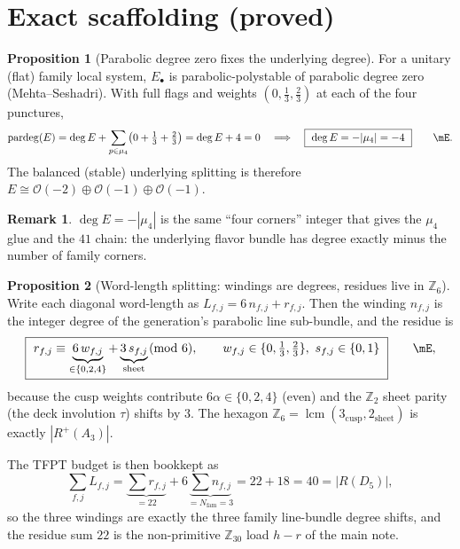 \documentclass[11pt,a4paper]{article}
\newcommand{\Nfam}{N_{\mathrm{fam}}}
\newcommand{\pardeg}{\operatorname{pardeg}}
\theoremstyle{definition}
\newtheorem{proposition}{Proposition}
\newtheorem*{remark}{Remark}
\begin{document}
\section{Exact scaffolding (proved)}
\begin{proposition}[Parabolic degree zero fixes the underlying degree]
For a unitary (flat) family local system, $E_\bullet$ is parabolic-polystable of parabolic degree zero
(Mehta--Seshadri). With full flags and weights $(0,\tfrac13,\tfrac23)$ at each of the four punctures,
\begin{equation}
  \pardeg(E)=\deg E+\sum_{p\in\mu_4}\bigl(0+\tfrac13+\tfrac23\bigr)=\deg E+4=0
  \quad\Longrightarrow\quad \boxed{\ \deg E=-|\mu_4|=-4\ }\qquad\mE .
\end{equation}
The balanced (stable) underlying splitting is therefore $E\cong\mathcal O(-2)\oplus\mathcal O(-1)\oplus\mathcal O(-1)$. \mE
\end{proposition}

\begin{remark}
$\deg E=-|\mu_4|$ is the same ``four corners'' integer that gives the $\mu_4$ glue and the $41$ chain:
the underlying flavor bundle has degree exactly minus the number of family corners.
\end{remark}

\begin{proposition}[Word-length splitting: windings are degrees, residues live in $\mathbb Z_6$]
Write each diagonal word-length as $L_{f,j}=6\,n_{f,j}+r_{f,j}$. Then the winding $n_{f,j}$ is the
integer degree of the generation's parabolic line sub-bundle, and the residue is
\begin{equation}
  \boxed{\ r_{f,j}\equiv \underbrace{6\,w_{f,j}}_{\in\{0,2,4\}}+\underbrace{3\,s_{f,j}}_{\text{sheet}}\!\!\pmod 6,\qquad
  w_{f,j}\in\{0,\tfrac13,\tfrac23\},\ s_{f,j}\in\{0,1\}\ }\qquad\mE ,
\end{equation}
because the cusp weights contribute $6\alpha\in\{0,2,4\}$ (even) and the $\mathbb Z_2$ sheet parity (the
deck involution $\tau$) shifts by $3$. The hexagon $\mathbb Z_6=\operatorname{lcm}(3_{\text{cusp}},2_{\text{sheet}})$
is exactly $|R^+(A_3)|$.
\end{proposition}

\noindent The TFPT budget is then bookkept as
\begin{equation}
  \sum_{f,j}L_{f,j}=\underbrace{\sum r_{f,j}}_{=22}+6\underbrace{\sum n_{f,j}}_{=\Nfam=3}=22+18=40=|R(D_5)| ,
\end{equation}
so the three windings are exactly the three family line-bundle degree shifts, and the residue sum $22$
is the non-primitive $\mathbb Z_{30}$ load $h-r$ of the main note. \mE
\end{document}
